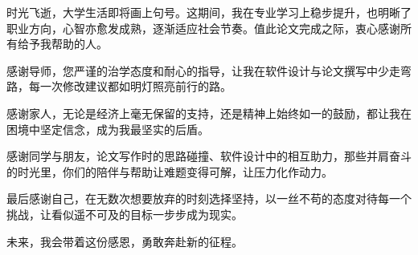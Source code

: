 
时光飞逝，大学生活即将画上句号。这期间，我在专业学习上稳步提升，也明晰了职业方向，心智亦愈发成熟，逐渐适应社会节奏。值此论文完成之际，衷心感谢所有给予我帮助的人。  

感谢导师，您严谨的治学态度和耐心的指导，让我在软件设计与论文撰写中少走弯路，每一次修改建议都如明灯照亮前行的路。  

感谢家人，无论是经济上毫无保留的支持，还是精神上始终如一的鼓励，都让我在困境中坚定信念，成为我最坚实的后盾。  

感谢同学与朋友，论文写作时的思路碰撞、软件设计中的相互助力，那些并肩奋斗的时光里，你们的陪伴与帮助让难题变得可解，让压力化作动力。  

最后感谢自己，在无数次想要放弃的时刻选择坚持，以一丝不苟的态度对待每一个挑战，让看似遥不可及的目标一步步成为现实。  

未来，我会带着这份感恩，勇敢奔赴新的征程。